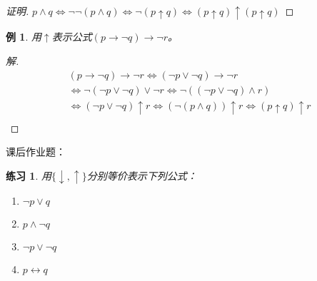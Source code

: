\documentclass{article}
\newtheorem{Exercise}{练习}
\newtheorem*{Example}{例}
\begin{document}
\begin{CJK*}{UTF8}{gbsn}
\begin{proof}[证明]
    $p\land q \Leftrightarrow \lnot \lnot (p\land q) \Leftrightarrow \lnot (p\uparrow q) \Leftrightarrow (p\uparrow q)\uparrow (p\uparrow q)$
  \end{proof}
  \begin{Example}
    用$\uparrow$表示公式$(p\to \lnot q)\to \lnot r$。
  \end{Example}
  \begin{proof}[解]
    \begin{align*}
      &(p\to \lnot q)\to \lnot r\Leftrightarrow (\lnot p \lor \lnot q)\to \lnot r\\
      &\Leftrightarrow \lnot (\lnot p \lor \lnot q)\lor \lnot r \Leftrightarrow\lnot ((\lnot p \lor \lnot q)\land r)\\
      &\Leftrightarrow (\lnot p \lor \lnot q)\uparrow r \Leftrightarrow (\lnot (p \land q))\uparrow r\Leftrightarrow (p\uparrow q)\uparrow r\\
    \end{align*}
  \end{proof}
  课后作业题：
  \begin{Exercise}
    用$\{\downarrow, \uparrow \}$分别等价表示下列公式：
    \begin{enumerate}
      \item $\lnot p\lor q$
      \item $p\land \lnot q$
      \item $\lnot p \lor \lnot q$
      \item $p\leftrightarrow q$
    \end{enumerate}

    
  \end{Exercise}
\end{CJK*}
\end{document}
